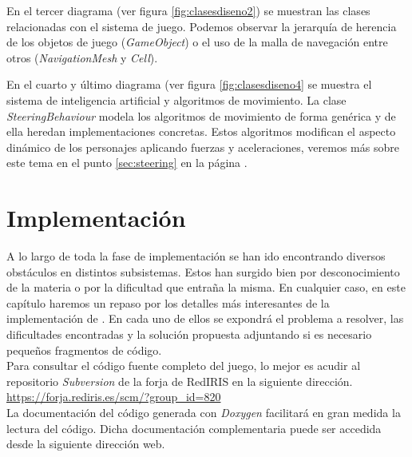 
En el tercer diagrama (ver figura \ref{fig:clasesdiseno2}) se
muestran las clases relacionadas con el sistema de juego. Podemos
observar la jerarquía de herencia de los objetos de juego (\textit{GameObject})
o el uso de la malla de navegación entre otros (\textit{NavigationMesh} y
\textit{Cell}).\\


En el cuarto y último diagrama (ver figura \ref{fig:clasesdiseno4} se muestra
el sistema de inteligencia artificial y algoritmos de movimiento. La clase
\textit{SteeringBehaviour} modela los algoritmos de movimiento de forma
genérica y de ella heredan implementaciones concretas. Estos algoritmos
modifican el aspecto dinámico de los personajes aplicando fuerzas y aceleraciones,
veremos más sobre este tema en el punto \ref{sec:steering} en la página
\pageref{sec:steering}.\\


\section{Implementación}

A lo largo de toda la fase de implementación se han ido encontrando diversos
obstáculos en distintos subsistemas. Estos han surgido bien por desconocimiento
de la materia o por la dificultad que entraña la misma. En cualquier caso, 
en este capítulo haremos un repaso por los detalles más interesantes de
la implementación de \juego. En cada uno de ellos se expondrá el problema
a resolver, las dificultades encontradas y la solución propuesta adjuntando
si es necesario pequeños fragmentos de código.\\

Para consultar el código fuente completo del juego, lo mejor es acudir
al repositorio \textit{Subversion} de la forja de RedIRIS en la siguiente
dirección.\\

\url{https://forja.rediris.es/scm/?group_id=820}\\

La documentación del código generada con \textit{Doxygen} \cite{website:doxygen}
facilitará en gran medida la lectura del código. Dicha documentación
complementaria puede ser accedida desde la siguiente dirección web.\\

